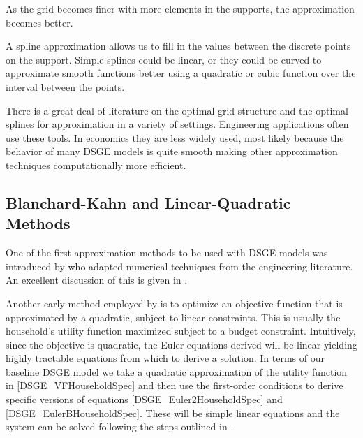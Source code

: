 \documentclass[letterpaper,12pt]{article}
\theoremstyle{definition}
\begin{document}
\begin{spacing}{1.5}
		As the grid becomes finer with more elements in the supports, the approximation becomes better.

		A spline approximation allows us to fill in the values between the discrete points on the support.  Simple splines could be linear, or they could be curved to approximate smooth functions better using a quadratic or cubic function over the interval between the points.

		There is a great deal of literature on the optimal grid structure and the optimal splines for approximation in a variety of settings.  Engineering applications often use these tools.  In economics they are less widely used, most likely because the behavior of many DSGE models is quite smooth making other approximation techniques computationally more efficient.

	\subsection{Blanchard-Kahn and Linear-Quadratic Methods}\label{LinQuadSol}
		One of the first approximation methods to be used with DSGE models was introduced by \citet{BlanchardKahn1980} who adapted numerical techniques from the engineering literature.  An excellent discussion of this is given in \citet[pp. 129-132]{McCandless2008}.

		Another early method employed by \citet{KydlandPrescott1982} is to optimize an objective function that is approximated by a quadratic, subject to linear constraints.  This is usually the household's utility function maximized subject to a budget constraint.  Intuitively, since the objective is quadratic, the Euler equations derived will be linear yielding highly tractable equations from which to derive a solution.  In terms of our baseline DSGE model we take a quadratic approximation of the utility function in \eqref{DSGE_VFHouseholdSpec} and then use the first-order conditions to derive specific versions of equations \eqref{DSGE_Euler2HouseholdSpec} and \eqref{DSGE_EulerBHouseholdSpec}.  These will be simple linear equations and the system can be solved following the steps outlined in \citet[ch. 7]{McCandless2008}.


\end{spacing}
\end{document}
